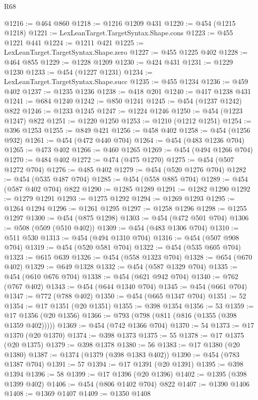 \begin{lexlean}{R68}
\begin{coremodule}
@1216 := @464 @860
@1218 := @1216 @1209 @431
@1220 := @454 (@1215 @1218)
@1221 := LexLeanTarget.TargetSyntax.Shape.cons
@1223 := @455 @1221 @441
@1224 := @1211 @421
@1225 := LexLeanTarget.TargetSyntax.Shape.zero
@1227 := @455 @1225 @402
@1228 := @464 @855
@1229 := @1228 @1209
@1230 := @424 @431
@1231 := @1229 @1230
@1233 := @454 (@1227 @1231)
@1234 := LexLeanTarget.TargetSyntax.Shape.succ
@1235 := @455 @1234
@1236 := @459 @402
@1237 := @1235 @1236
@1238 := @418 @201
@1240 := @417 @1238 @431
@1241 := @684 @1240
@1242 := @850 @1241
@1245 := @454 (@1237 @1242) @822
@1246 := @1233 @1245
@1247 := @1224 @1246
@1250 := @454 (@1223 @1247) @822
@1251 := @1220 @1250
@1253 := @1210 (@1212 @1251)
@1254 := @396 @1253
@1255 := @849 @421
@1256 := @458 @402
@1258 := @454 (@1256 @932)
@1261 := @454 (@472 @440 @704)
@1264 := @454 (@483 @1236 @704)
@1265 := @473 @402
@1266 := @460 @1265
@1269 := @454 (@494 @1266 @704)
@1270 := @484 @402
@1272 := @474 (@475 @1270)
@1275 := @454 (@507 @1272 @704)
@1276 := @485 @402
@1279 := @454 (@520 @1276 @704)
@1282 := @454 (@535 @487 @704)
@1285 := @454 (@558 @885 @704)
@1289 := @454 (@587 @402 @704) @822
@1290 := @1285 @1289
@1291 := @1282 @1290
@1292 := @1279 @1291
@1293 := @1275 @1292
@1294 := @1269 @1293
@1295 := @1264 @1294
@1296 := @1261 @1295
@1297 := @1258 @1296
@1298 := @1255 @1297
@1300 := @454 (@875 @1298)
@1303 := @454 (@472 @501 @704)
@1306 := @508 (@509 (@510 @402))
@1309 := @454 (@483 @1306 @704)
@1310 := @511 @530
@1313 := @454 (@494 @1310 @704)
@1316 := @454 (@507 @908 @704)
@1319 := @454 (@520 @581 @704)
@1322 := @454 (@535 @605 @704)
@1323 := @615 @639
@1326 := @454 (@558 @1323 @704)
@1328 := @654 (@670 @402)
@1329 := @649 @1328
@1332 := @454 (@587 @1329 @704)
@1335 := @454 (@610 @676 @704)
@1338 := @454 (@621 @942 @704)
@1340 := @762 (@767 @402)
@1343 := @454 (@644 @1340 @704)
@1345 := @454 (@661 @704)
@1347 := @772 (@788 @402)
@1350 := @454 (@665 @1347 @704)
@1351 := 52
@1354 := @17 @1351 (@20 @1351)
@1355 := @398 @1354
@1356 := 53
@1359 := @17 @1356 (@20 @1356)
@1366 := @793 (@798 (@811 (@816 (@1355 (@398 @1359 @402)))))
@1369 := @454 (@742 @1366 @704)
@1370 := 54
@1373 := @17 @1370 (@20 @1370)
@1374 := @398 @1373
@1375 := 55
@1378 := @17 @1375 (@20 @1375)
@1379 := @398 @1378
@1380 := 56
@1383 := @17 @1380 (@20 @1380)
@1387 := @1374 (@1379 (@398 @1383 @402))
@1390 := @454 (@783 @1387 @704)
@1391 := 57
@1394 := @17 @1391 (@20 @1391)
@1395 := @398 @1394
@1396 := 58
@1399 := @17 @1396 (@20 @1396)
@1402 := @1395 (@398 @1399 @402)
@1406 := @454 (@806 @1402 @704) @822
@1407 := @1390 @1406
@1408 := @1369 @1407
@1409 := @1350 @1408

\end{coremodule}
\end{lexlean}
